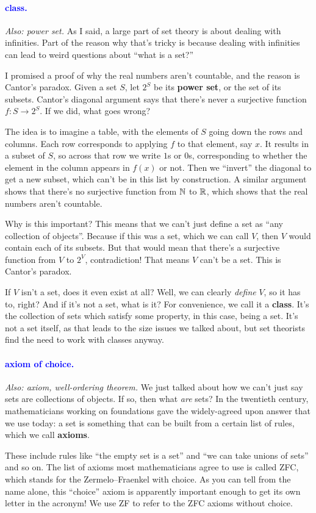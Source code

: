 \documentclass[11pt,paper=letter]{scrartcl}
\renewcommand{\bluebf}[1]{{\bfseries \color{Blue} #1}}
\renewcommand\wp[1]{\paragraph{\textcolor{Blue}{#1.}} \hspace{-1em}}
\newcommand\wl[1]{\label{w:#1}}
\newcommand\oww[1]{\textit{Also: #1.}}
\begin{document}
\wp{class}
\wl{class}
\oww{power set}
As I said, a large part of set theory is about dealing with infinities. Part of the reason why that's tricky is because dealing with infinities can lead to weird questions about ``what is a set?''

I promised a proof of why the real numbers aren't countable, and the reason is Cantor's paradox. Given a set $S$, let $2^S$ be its \textbf{power set}, or the set of its subsets. Cantor's diagonal argument says that there's never a surjective function $f : S \to 2^S$. If we did, what goes wrong?

The idea is to imagine a table, with the elements of $S$ going down the rows and columns. Each row corresponds to applying $f$ to that element, say $x$. It results in a subset of $S$, so across that row we write $1$s or $0$s, corresponding to whether the element in the column appears in $f(x)$ or not. Then we ``invert'' the diagonal to get a new subset, which can't be in this list by construction. A similar argument shows that there's no surjective function from $\mathbb N$ to $\mathbb R$, which shows that the real numbers aren't countable.

Why is this important? This means that we can't just define a set as ``any collection of objects''. Because if this was a set, which we can call $V$, then $V$ would contain each of its subsets. But that would mean that there's a surjective function from $V$ to $2^V$, contradiction! That means $V$ can't be a set. This is Cantor's paradox.

If $V$ isn't a set, does it even exist at all? Well, we can clearly \textit{define} $V$, so it has to, right? And if it's not a set, what is it? For convenience, we call it a \bluebf{class}. It's the collection of sets which satisfy some property, in this case, being a set. It's not a set itself, as that leads to the size issues we talked about, but set theorists find the need to work with classes anyway.

\wp{axiom of choice}
\wl{axiom of choice}
\oww{axiom, well-ordering theorem}
We just talked about how we can't just say sets are collections of objects. If so, then what \textit{are} sets? In the twentieth century, mathematicians working on foundations gave the widely-agreed upon answer that we use today: a set is something that can be built from a certain list of rules, which we call \textbf{axioms}.

These include rules like ``the empty set is a set'' and ``we can take unions of sets'' and so on. The list of axioms most mathematicians agree to use is called ZFC, which stands for the Zermelo--Fraenkel with choice. As you can tell from the name alone, this ``choice'' axiom is apparently important enough to get its own letter in the acronym! We use ZF to refer to the ZFC axioms without choice.
\end{document}
